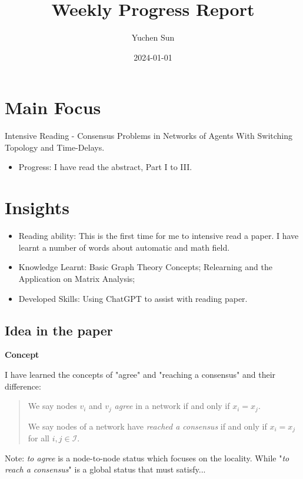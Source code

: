 \documentclass{article}
\title{Weekly Progress Report}
\author{Yuchen Sun}
\date{2024-01-01}
\begin{document}
\maketitle
\section*{Main Focus}

Intensive Reading - Consensus Problems in Networks of Agents With Switching Topology and Time-Delays.

\begin{itemize}
    \item Progress: I have read the abstract, Part I to III.
\end{itemize}

\section*{Insights}

\begin{itemize}
    \item Reading ability: This is the first time for me to intensive read a paper. I have learnt a number of words about automatic and math field.
    \item Knowledge Learnt: Basic Graph Theory Concepts; Relearning and the Application on Matrix Analysis;
    \item Developed Skills: Using ChatGPT to assist with reading paper.
\end{itemize}

\subsection*{Idea in the paper}

\noindent\textbf{Concept}

I have learned the concepts of "agree" and "reaching a consensus" and their difference:

\begin{quote}
We say nodes \( v_i \) and \( v_j \) \textit{agree} in a network if and only if \( x_i = x_j \).

We say nodes of a network have \textit{reached a consensus} if and only if \( x_i = x_j \) for all \( i, j \in \mathcal{I} \).
\end{quote}

Note: \textit{to agree} is a node-to-node status which focuses on the locality. While "\textit{to reach a consensus}" is a global status that must satisfy...
\end{document}
